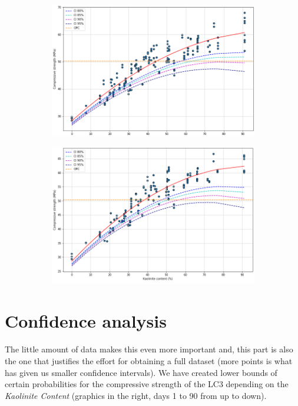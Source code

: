 \documentclass[10pt,conference,compsocconf]{IEEEtran}
\begin{document}
\begin{figure}
\begin{subfigure}{.5\textwidth}
  \label{fig:sub-third}
\end{subfigure}
\newline
\begin{subfigure}{.5\textwidth}
  \centering
  \includegraphics[width=0.84\columnwidth]{figures/day28_CI.png}  
  \label{fig:sub-fourth}
\end{subfigure}
\newline
\begin{subfigure}{.5\textwidth}
  \centering
  \includegraphics[width=0.84\columnwidth]{figures/day90_CI.png}  
  \label{fig:sub-fourth}
\end{subfigure}
\end{figure}

\section{Confidence analysis}

The little amount of data makes this even more important and, this part is also the one that justifies the effort for obtaining a full dataset (more points is what has given us smaller confidence intervals). We have created lower bounds of certain probabilities for the compressive strength of the LC3 depending on the \textit{Kaolinite Content} (graphics in the right, days 1 to 90 from up to down). 
\end{document}
